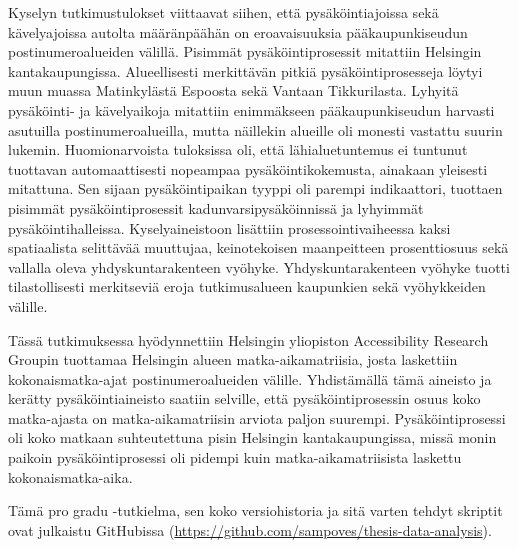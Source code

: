 Kyselyn tutkimustulokset viittaavat siihen, että pysäköintiajoissa sekä kävelyajoissa autolta määränpäähän on eroavaisuuksia pääkaupunkiseudun postinumeroalueiden välillä. Pisimmät pysäköintiprosessit mitattiin Helsingin kantakaupungissa. Alueellisesti merkittävän pitkiä pysäköintiprosesseja löytyi muun muassa Matinkylästä Espoosta sekä Vantaan Tikkurilasta. Lyhyitä pysäköinti- ja kävelyaikoja mitattiin enimmäkseen pääkaupunkiseudun harvasti asutuilla postinumeroalueilla, mutta näillekin alueille oli monesti vastattu suurin lukemin. Huomionarvoista tuloksissa oli, että lähialuetuntemus ei tuntunut tuottavan automaattisesti nopeampaa pysäköintikokemusta, ainakaan yleisesti mitattuna. Sen sijaan pysäköintipaikan tyyppi oli parempi indikaattori, tuottaen pisimmät pysäköintiprosessit kadunvarsipysäköinnissä ja lyhyimmät pysäköintihalleissa. Kyselyaineistoon lisättiin prosessointivaiheessa kaksi spatiaalista selittävää muuttujaa, keinotekoisen maanpeitteen prosenttiosuus sekä vallalla oleva yhdyskuntarakenteen vyöhyke. Yhdyskuntarakenteen vyöhyke tuotti tilastollisesti merkitseviä eroja tutkimusalueen kaupunkien sekä vyöhykkeiden välille.

Tässä tutkimuksessa hyödynnettiin Helsingin yliopiston Accessibility Research Groupin tuottamaa Helsingin alueen matka-aikamatriisia, josta laskettiin kokonaismatka-ajat postinumeroalueiden välille. Yhdistämällä tämä aineisto ja kerätty pysäköintiaineisto saatiin selville, että pysäköintiprosessin osuus koko matka-ajasta on matka-aikamatriisin arviota paljon suurempi. Pysäköintiprosessi oli koko matkaan suhteutettuna pisin Helsingin kantakaupungissa, missä monin paikoin pysäköintiprosessi oli pidempi kuin matka-aikamatriisista laskettu kokonaismatka-aika.

Tämä pro gradu -tutkielma, sen koko versiohistoria ja sitä varten tehdyt skriptit ovat julkaistu GitHubissa (\textcolor{blue}{\url{https://github.com/sampoves/thesis-data-analysis}}).